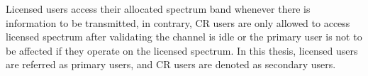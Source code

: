 


Licensed users access their allocated spectrum band whenever there is information to be transmitted, in contrary, CR users are only allowed to access licensed spectrum after validating the channel is idle or the primary user is not to be affected if they operate on the licensed spectrum.
In this thesis, licensed users are referred as primary users, and CR users are denoted as secondary users.

